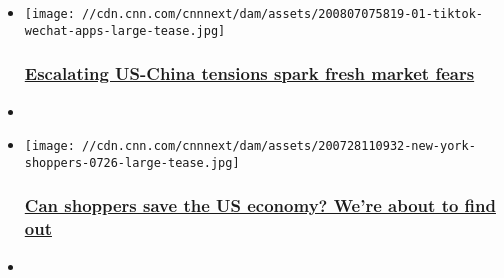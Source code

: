 \begin{itemize}
\item
  \href{/2020/08/07/investing/premarket-stocks-trading/index.html}{}

  \texttt{[image: //cdn.cnn.com/cnnnext/dam/assets/200807075819-01-tiktok-wechat-apps-large-tease.jpg]}

  \hypertarget{escalating-us-china-tensions-spark-fresh-market-fears}{%
  \subsubsection{\texorpdfstring{\href{/2020/08/07/investing/premarket-stocks-trading/index.html}{Escalating
  US-China tensions spark fresh market
  fears}}{Escalating US-China tensions spark fresh market fears}}\label{escalating-us-china-tensions-spark-fresh-market-fears}}
\item
\end{itemize}

\begin{itemize}
\item
  \href{/2020/07/28/investing/premarket-stocks-trading/index.html}{}

  \texttt{[image: //cdn.cnn.com/cnnnext/dam/assets/200728110932-new-york-shoppers-0726-large-tease.jpg]}

  \hypertarget{can-shoppers-save-the-us-economy-were-about-to-find-out}{%
  \subsubsection{\texorpdfstring{\href{/2020/07/28/investing/premarket-stocks-trading/index.html}{Can
  shoppers save the US economy? We're about to find
  out}}{Can shoppers save the US economy? We're about to find out}}\label{can-shoppers-save-the-us-economy-were-about-to-find-out}}
\item
\end{itemize}

